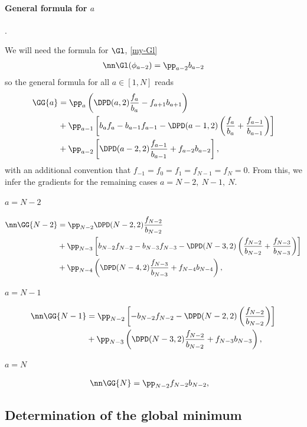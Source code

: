 \paragraph{General formula for $a$}. 

We will need the formula for $\Gl$, \eqref{my-Gl}
  \begin{align}
    \nn\Gl(\phi_{a-2})=\pp_{a-2}b_{a-2}
\end{align}
so the general formula for all $a\in[1,N]$ reads
\begin{align}
  \GG{a}&=
  \pp_a
    \left(\DPD(a,2)\frac{f_a}{b_a}-f_{a+1}b_{a+1}\right)\\
    &+\pp_{a-1}\left[b_{a}f_a-b_{a-1}f_{a-1}-
    \DPD({a-1},2)\left(\frac{f_a}{b_a}+\frac{f_{a-1}}{b_{a-1}}\right)\right]\\
    &+\pp_{a-2}\left[\DPD(a-2,2)\frac{f_{a-1}}{b_{a-1}}+f_{a-2}b_{a-2}\right],
\end{align}
with an additional convention that $f_{-1}=f_0=f_1=f_{N-1}=f_N=0$.
From this, we infer the gradients for the remaining cases $a=N-2,\ N-1,\ N$.

\paragraph{$a=N-2$}

  \begin{align}
    \nn\GG{N-2}&=
    \pp_{N-2}
    \DPD(N-2,2)\frac{f_{N-2}}{b_{N-2}}\\
    &+\pp_{N-3}\left[b_{N-2}f_{N-2}-b_{N-3}f_{N-3}-
    \DPD(N-3,2)\left(\frac{f_{N-2}}{b_{N-2}}+\frac{f_{N-3}}{b_{N-3}}\right)\right]\\
    &+\pp_{N-4}\left(\DPD(N-4,2)\frac{f_{N-3}}{b_{N-3}}+f_{N-4}b_{N-4}\right),
  \end{align}

\paragraph{$a=N-1$}

  \begin{align}
    \nn\GG{N-1}&=
    \pp_{N-2}\left[-b_{N-2}f_{N-2}-
    \DPD(N-2,2)\left(\frac{f_{N-2}}{b_{N-2}}\right)\right]\\
    &+\pp_{N-3}\left(\DPD(N-3,2)\frac{f_{N-2}}{b_{N-2}}+f_{N-3}b_{N-3}\right),
  \end{align}

\paragraph{$a=N$}
 \begin{align}
    \nn\GG{N}&=
    \pp_{N-2}f_{N-2}b_{N-2},
  \end{align}


\subsection{Determination of the global minimum}



